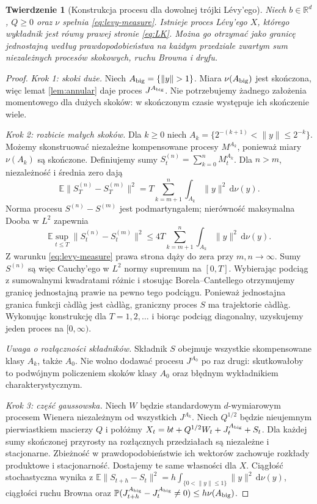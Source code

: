 \documentclass[11pt,a4paper,oneside]{report}
\numberwithin{equation}{chapter}
\theoremstyle{plain}
\newtheorem{twierdzenie}{Twierdzenie}[chapter]
\theoremstyle{definition}
\theoremstyle{remark}
\newcommand{\R}{\mathbb{R}}
\newcommand{\Prob}{\mathbb{P}}
\newcommand{\E}{\mathbb{E}}
\newcommand{\dd}{\mathrm{d}}
\begin{document}
\begin{twierdzenie}[Konstrukcja procesu dla dowolnej trójki Lévy'ego]\label{thm:volIII:10:04}
\label{th:triplet-construction}
Niech $b\in\R^d$, $Q\ge0$ oraz $\nu$ spełnia
\eqref{eq:levy-measure}. Istnieje proces Lévy'ego
$X$, którego wykładnik jest równy prawej stronie
\eqref{eq:LK}. Można go otrzymać jako granicę
jednostajną według prawdopodobieństwa na każdym
przedziale zwartym sum niezależnych procesów skokowych,
ruchu Browna i dryfu.
\end{twierdzenie}
\begin{proof}
\emph{Krok 1: skoki duże.} Niech $A_{\rm big}=\{\|y\|>1\}$.
Miara $\nu(A_{\rm big})$ jest skończona, więc lemat
\ref{lem:annular} daje proces $J^{A_{\rm big}}$. Nie potrzebujemy
żadnego założenia momentowego dla dużych skoków:
w skończonym czasie występuje ich skończenie wiele.

\emph{Krok 2: rozbicie małych skoków.} Dla $k\ge0$ niech
$A_k=\{2^{-(k+1)}<\|y\|\le2^{-k}\}$.
Możemy skonstruować niezależne kompensowane procesy
$M^{A_k}$, ponieważ miary $\nu(A_k)$ są skończone.
Definiujemy sumy $S_t^{(n)}=\sum_{k=0}^n M_t^{A_k}$.
Dla $n>m$, niezależność i średnia zero dają
\[
\E\|S_T^{(n)}-S_T^{(m)}\|^2
=T\sum_{k=m+1}^n\int_{A_k}\|y\|^2\,\dd\nu(y).
\]
Norma procesu $S^{(n)}-S^{(m)}$ jest podmartyngałem;
nierówność maksymalna Dooba w $L^2$ zapewnia
\[
\E\sup_{t\le T}\|S_t^{(n)}-S_t^{(m)}\|^2
\le4T\sum_{k=m+1}^n\int_{A_k}\|y\|^2\,\dd\nu(y).
\tag{10.4}\label{eq:levy-l2-sup}
\]
Z warunku \eqref{eq:levy-measure} prawa strona dąży
do zera przy $m,n\to\infty$. Sumy $S^{(n)}$
są więc Cauchy'ego w $L^2$ normy supremum na
$[0,T]$. Wybierając podciąg z sumowalnymi kwadratami
różnic i stosując Borela--Cantellego otrzymujemy
granicę jednostajną prawie na pewno tego podciągu.
Ponieważ jednostajna granica funkcji càdlàg jest càdlàg,
graniczny proces $S$ ma trajektorie càdlàg.
Wykonując konstrukcję dla $T=1,2,\ldots$ i biorąc podciąg
diagonalny, uzyskujemy jeden proces na $[0,\infty)$.

\emph{Uwaga o rozłączności składników.} Składnik $S$ obejmuje
wszystkie skompensowane klasy $A_k$, także $A_0$.
Nie wolno dodawać procesu $J^{A_0}$ po raz drugi: skutkowałoby
to podwójnym policzeniem skoków klasy $A_0$ oraz błędnym
wykładnikiem charakterystycznym.

\emph{Krok 3: część gaussowska.} Niech $W$ będzie
standardowym $d$-wymiarowym procesem Wienera
niezależnym od wszystkich $J^{A_k}$. Niech $Q^{1/2}$
będzie nieujemnym pierwiastkiem macierzy $Q$ i połóżmy
$X_t=bt+Q^{1/2}W_t+J_t^{A_{\rm big}}+S_t$.
Dla każdej sumy skończonej przyrosty na rozłącznych
przedziałach są niezależne i stacjonarne. Zbieżność w
prawdopodobieństwie ich wektorów zachowuje rozkłady
produktowe i stacjonarność. Dostajemy te same własności
dla $X$. Ciągłość stochastyczna wynika z
$\E\|S_{t+h}-S_t\|^2
=h\int_{\{0<\|y\|\le1\}}\|y\|^2\,\dd\nu(y)$,
ciągłości ruchu Browna oraz
$\Prob(J_{t+h}^{A_{\rm big}}-J_t^{A_{\rm big}}\ne0)\le h\nu(A_{\rm big})$.


\end{proof}
\end{document}
